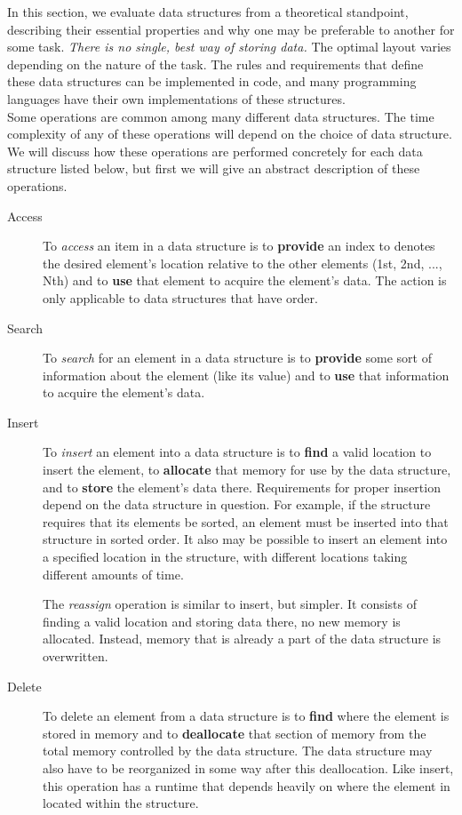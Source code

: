 In this section, we evaluate data structures from a theoretical standpoint, describing their essential properties and why one may be preferable to another for some task. \textit{There is no single, best way of storing data.} The optimal layout varies depending on the nature of the task. The rules and requirements that define these data structures can be implemented in code, and many programming languages have their own implementations of these structures. \\

Some operations are common among many different data structures. The time complexity of any of these operations will depend on the choice of data structure. We will discuss how these operations are performed concretely for each data structure listed below, but first we will give an abstract description of these operations. \\

\begin{description}
	\item[Access] To \textit{access} an item in a data structure is to \textbf{provide} an index to denotes the desired element's location relative to the other elements (1st, 2nd, ..., Nth) and to \textbf{use} that element to acquire the element's data. The action is only applicable to data structures that have order.
	\item[Search] To \textit{search} for an element in a data structure is to \textbf{provide} some sort of information about the element (like its value) and to \textbf{use} that information to acquire the element's data.
	\item[Insert] To \textit{insert} an element into a data structure is to \textbf{find} a valid location to insert the element, to \textbf{allocate} that memory for use by the data structure, and to \textbf{store} the element's data there. Requirements for proper insertion depend on the data structure in question. For example, if the structure requires that its elements be sorted, an element must be inserted into that structure in sorted order. It also may be possible to insert an element into a specified location in the structure, with different locations taking different amounts of time.
	
	The \textit{reassign} operation is similar to insert, but simpler. It consists of finding a valid location and storing data there, no new memory is allocated. Instead, memory that is already a part of the data structure is overwritten.
	\item[Delete] To delete an element from a data structure is to \textbf{find} where the element is stored in memory and to \textbf{deallocate} that section of memory from the total memory controlled by the data structure. The data structure may also have to be reorganized in some way after this deallocation. Like insert, this operation has a runtime that depends heavily on where the element in located within the structure.
\end{description}
\vspace{5mm}

